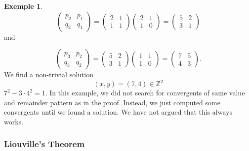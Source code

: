 \documentclass[a4paper,11pt,american]{article}
\newcommand{\Z}{\mathbb{Z}}
\theoremstyle{plain}
\theoremstyle{definition}
\newtheorem{example}{Exemple}
\begin{document}
\begin{example}
    \begin{displaymath}
      \begin{pmatrix}
        p_{2} & p_{1}  \\
        q_{2} & q_{1}  
      \end{pmatrix} =
      \begin{pmatrix}
        2 & 1  \\
        1 & 1  
      \end{pmatrix}
       \begin{pmatrix}
        2 & 1  \\
        1 & 0  
      \end{pmatrix}  =
      \begin{pmatrix}
        5 & 2  \\
        3 & 1  
      \end{pmatrix} 
    \end{displaymath}
    and
    
    \begin{displaymath}
      \begin{pmatrix}
        p_{3} & p_{2}  \\
        q_{3} & q_{2}  
      \end{pmatrix} =
      \begin{pmatrix}
        5 & 2  \\
        3 & 1  
      \end{pmatrix}
       \begin{pmatrix}
        1 & 1  \\
        1 & 0  
      \end{pmatrix}  =
      \begin{pmatrix}
        7 & 5  \\
        4 & 3  
      \end{pmatrix}. 
    \end{displaymath}
    We find a non-trivial solution
    \begin{displaymath}
      (x,y) = (7,4)  \in\Z^2
    \end{displaymath}
    $7^2 - 3\cdot 4^2 = 1$. In this example, we did not search for convergents of same value and remainder pattern as in the proof. Instead, we just computed some convergents until we found a solution. We have not argued that  this always works. 
  \end{example}


\subsubsection*{Liouville's Theorem}
\end{document}
